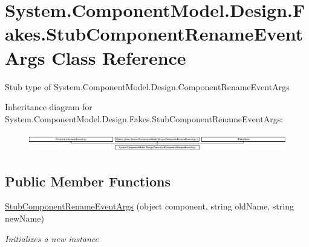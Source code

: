 \hypertarget{class_system_1_1_component_model_1_1_design_1_1_fakes_1_1_stub_component_rename_event_args}{\section{System.\-Component\-Model.\-Design.\-Fakes.\-Stub\-Component\-Rename\-Event\-Args Class Reference}
\label{class_system_1_1_component_model_1_1_design_1_1_fakes_1_1_stub_component_rename_event_args}
}


Stub type of System.\-Component\-Model.\-Design.\-Component\-Rename\-Event\-Args 


Inheritance diagram for System.\-Component\-Model.\-Design.\-Fakes.\-Stub\-Component\-Rename\-Event\-Args\-:\begin{figure}[H]
\begin{center}
\leavevmode
\includegraphics[height=0.801144cm]{class_system_1_1_component_model_1_1_design_1_1_fakes_1_1_stub_component_rename_event_args}
\end{center}
\end{figure}
\subsection*{Public Member Functions}
\begin{DoxyCompactItemize}
\item 
\hyperlink{class_system_1_1_component_model_1_1_design_1_1_fakes_1_1_stub_component_rename_event_args_a005df7e3b37e3df6bfa99926ac8d1289}{Stub\-Component\-Rename\-Event\-Args} (object component, string old\-Name, string new\-Name)
\begin{DoxyCompactList}\small\item\em Initializes a new instance\end{DoxyCompactList}\end{DoxyCompactItemize}
